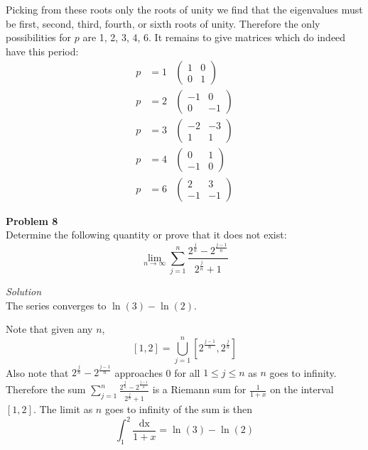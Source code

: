 \documentclass{amsart}
\begin{document}
Picking from these roots only the roots of unity we find that the eigenvalues must be first, second, third, fourth, or sixth roots of unity.
Therefore the only possibilities for $p$ are 1, 2, 3, 4, 6.
It remains to give matrices which do indeed have this period:
\vspace{-14cm}
\begin{align*}
p &= 1 & \begin{pmatrix} 1 & 0 \\ 0 & 1 \end{pmatrix} \\
p &= 2 & \begin{pmatrix} -1 & 0 \\ 0 & -1 \end{pmatrix} \\
p &= 3 & \begin{pmatrix} -2 & -3 \\ 1 & 1 \end{pmatrix} \\
p &= 4 & \begin{pmatrix} 0 & 1 \\ -1 & 0 \end{pmatrix} \\
p &= 6 & \begin{pmatrix} 2 & 3 \\ -1 & -1 \end{pmatrix}
\end{align*}

\pagebreak

\textbf{Problem 8}\\
Determine the following quantity or prove that it does not exist:
\[ \lim_{n \to \infty} \sum_{j = 1}^n \frac{2^\frac{j}{n} - 2^\frac{j - 1}{n}}{2^\frac{j}{n} + 1} \]

\textit{Solution}\\
The series converges to $\ln(3) - \ln(2)$.

Note that given any $n$,
\[ [1, 2] = \bigcup_{j = 1}^n \left[ 2^\frac{j - 1}{n}, 2^\frac{j}{n} \right] \]
Also note that $2^\frac{j}{n} - 2^\frac{j - 1}{n}$ approaches 0 for all $1 \leq j \leq n$ as $n$ goes to infinity.
Therefore the sum $\displaystyle \sum_{j = 1}^n \frac{2^\frac{j}{n} - 2^\frac{j - 1}{n}}{2^\frac{j}{n} + 1}$ is a Riemann sum for $\displaystyle \frac{1}{1 + x}$ on the interval $[1, 2]$.
The limit as $n$ goes to infinity of the sum is then
\[ \int_1^2 \frac{\text{dx}}{1 + x} = \ln(3) - \ln(2) \]
\end{document}
